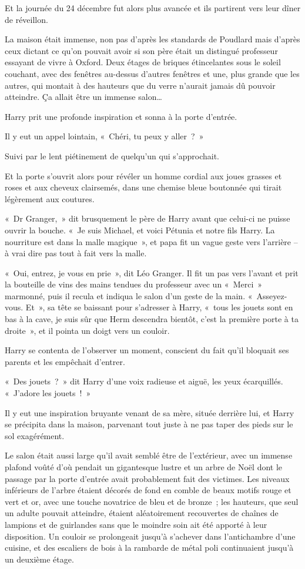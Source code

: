 Et la journée du 24 décembre fut alors plus avancée et ils partirent vers leur dîner de réveillon.

\later

La maison était immense, non pas d'après les standards de Poudlard mais d'après ceux dictant ce qu'on pouvait avoir si son père était un distingué professeur essayant de vivre à Oxford.
Deux étages de briques étincelantes sous le soleil couchant, avec des fenêtres au-dessus d'autres fenêtres et une, plus grande que les autres, qui montait à des hauteurs que du verre n'aurait jamais dû pouvoir atteindre.
Ça allait être un immense salon…

Harry prit une profonde inspiration et sonna à la porte d'entrée.

Il y eut un appel lointain, «~Chéri, tu peux y aller~?~»

Suivi par le lent piétinement de quelqu'un qui s'approchait.

Et la porte s'ouvrit alors pour révéler un homme cordial aux joues grasses et roses et aux cheveux clairsemés, dans une chemise bleue boutonnée qui tirait légèrement aux coutures.

«~Dr Granger,~» dit brusquement le père de Harry avant que celui-ci ne puisse ouvrir la bouche.
«~Je suis Michael, et voici Pétunia et notre fils Harry.
La nourriture est dans la malle magique~», et papa fit un vague geste vers l'arrière -- à vrai dire pas tout à fait vers la malle.

«~Oui, entrez, je vous en prie~», dit Léo Granger.
Il fit un pas vers l'avant et prit la bouteille de vins des mains tendues du professeur avec un «~Merci~» marmonné, puis il recula et indiqua le salon d'un geste de la main.
«~Asseyez-vous.
Et~», sa tête se baissant pour s'adresser à Harry, «~tous les jouets sont en bas à la cave, je suis sûr que Herm descendra bientôt, c'est la première porte à ta droite~», et il pointa un doigt vers un couloir.

Harry se contenta de l'observer un moment, conscient du fait qu'il bloquait ses parents et les empêchait d'entrer.

«~Des jouets~?~»
dit Harry d'une voix radieuse et aiguë, les yeux écarquillés.
«~J'adore les jouets~!~»

Il y eut une inspiration bruyante venant de sa mère, située derrière lui, et Harry se précipita dans la maison, parvenant tout juste à ne pas taper des pieds sur le sol exagérément.

Le salon était aussi large qu'il avait semblé être de l'extérieur, avec un immense plafond voûté d'où pendait un gigantesque lustre et un arbre de Noël dont le passage par la porte d'entrée avait probablement fait des victimes.
Les niveaux inférieurs de l'arbre étaient décorés de fond en comble de beaux motifs rouge et vert et or, avec une touche novatrice de bleu et de bronze~; les hauteurs, que seul un adulte pouvait atteindre, étaient aléatoirement recouvertes de chaînes de lampions et de guirlandes sans que le moindre soin ait été apporté à leur disposition.
Un couloir se prolongeait jusqu'à s'achever dans l'antichambre d'une cuisine, et des escaliers de bois à la rambarde de métal poli continuaient jusqu'à un deuxième étage.

